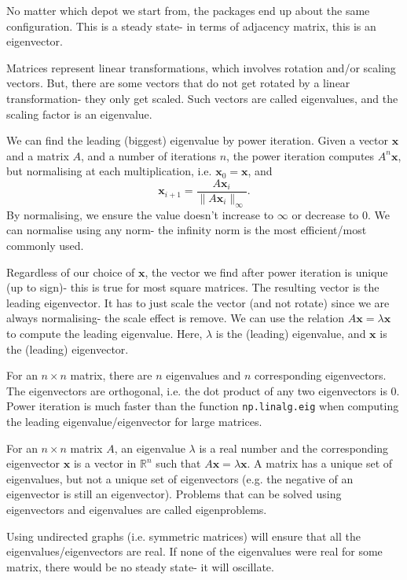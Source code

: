 \documentclass[a4paper, openany]{memoir}
\begin{document}
    \noindent No matter which depot we start from, the packages end up about the same configuration. This is a steady state- in terms of adjacency matrix, this is an eigenvector.

    Matrices represent linear transformations, which involves rotation and/or scaling vectors. But, there are some vectors that do not get rotated by a linear transformation- they only get scaled. Such vectors are called eigenvalues, and the scaling factor is an eigenvalue.

    We can find the leading (biggest) eigenvalue by power iteration. Given a vector $\mathbf{x}$ and a matrix $A$, and a number of iterations $n$, the power iteration computes $A^n \mathbf{x}$, but normalising at each multiplication, i.e. $\mathbf{x}_0 = \mathbf{x}$, and
    \[\mathbf{x}_{i+1} = \frac{A \mathbf{x}_i}{\lVert A \mathbf{x}_i \rVert_{\infty}}.\]
    By normalising, we ensure the value doesn't increase to $\infty$ or decrease to $0$. We can normalise using any norm- the infinity norm is the most efficient/most commonly used.

    Regardless of our choice of $\mathbf{x}$, the vector we find after power iteration is unique (up to sign)- this is true for most square matrices. The resulting vector is the leading eigenvector. It has to just scale the vector (and not rotate) since we are always normalising- the scale effect is remove. We can use the relation $A \mathbf{x} = \lambda \mathbf{x}$ to compute the leading eigenvalue. Here, $\lambda$ is the (leading) eigenvalue, and $\mathbf{x}$ is the (leading) eigenvector.

    For an $n \times n$ matrix, there are $n$ eigenvalues and $n$ corresponding eigenvectors. The eigenvectors are orthogonal, i.e. the dot product of any two eigenvectors is 0. Power iteration is much faster than the function \texttt{np.linalg.eig} when computing the leading eigenvalue/eigenvector for large matrices.

    For an $n \times n$ matrix $A$, an eigenvalue $\lambda$ is a real number and the corresponding eigenvector $\mathbf{x}$ is a vector in $\mathbb{R}^n$ such that $A \mathbf{x} = \lambda \mathbf{x}$. A matrix has a unique set of eigenvalues, but not a unique set of eigenvectors (e.g. the negative of an eigenvector is still an eigenvector). Problems that can be solved using eigenvectors and eigenvalues are called eigenproblems.

    Using undirected graphs (i.e. symmetric matrices) will ensure that all the eigenvalues/eigenvectors are real. If none of the eigenvalues were real for some matrix, there would be no steady state- it will oscillate.
\end{document}
